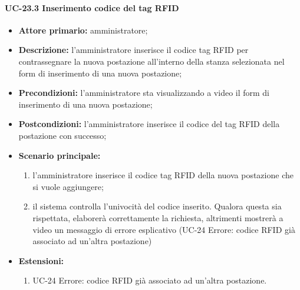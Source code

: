  \paragraph{UC-23.3 Inserimento codice del tag RFID}
 \begin{itemize}
	\item \textbf{Attore primario:} amministratore;
	\item \textbf{Descrizione:} l'amministratore inserisce il codice tag RFID per contrassegnare la nuova postazione all'interno della stanza selezionata nel form di inserimento di una nuova postazione;
	\item \textbf{Precondizioni:} l'amministratore sta visualizzando a video il form di inserimento di una nuova postazione;
	\item \textbf{Postcondizioni:} l'amministratore inserisce il codice del tag RFID della postazione con successo;
	\item \textbf{Scenario principale:}
	      \begin{enumerate}
		      \item l'amministratore inserisce il codice tag RFID della nuova postazione che si vuole aggiungere;
		      \item il sistema controlla l'univocità del codice inserito. Qualora questa sia rispettata, elaborerà correttamente la richiesta, altrimenti mostrerà a video un messaggio di errore esplicativo (UC-24 Errore: codice RFID già associato ad un'altra postazione)
	      \end{enumerate}
	      \item \textbf{Estensioni:}
		\begin{enumerate}
		      \item UC-24 Errore: codice RFID già associato ad un'altra postazione.
	      \end{enumerate}
\end{itemize}


